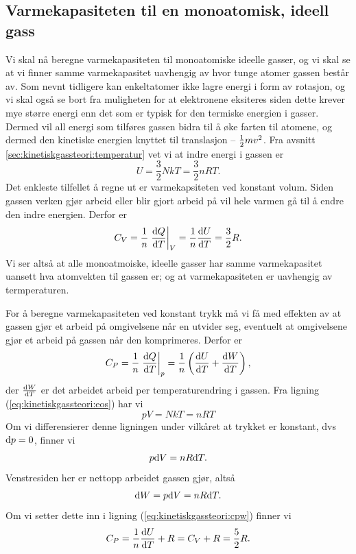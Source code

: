 \subsection{Varmekapasiteten til en monoatomisk, ideell gass}
Vi skal nå beregne varmekapasiteten til monoatomiske ideelle gasser, og vi skal se at vi finner samme varmekapasitet uavhengig av hvor tunge atomer gassen består av. Som nevnt tidligere kan enkeltatomer ikke lagre energi i form av rotasjon, og vi skal også se bort fra muligheten for at elektronene eksiteres siden dette krever mye større energi enn det som er typisk for den termiske energien i gasser. Dermed vil all energi som tilføres gassen bidra til å øke farten til atomene, og dermed den kinetiske energien knyttet til translasjon -- $\frac{1}{2} mv^2$. Fra avsnitt \ref{sec:kinetiskgassteori:temperatur} vet vi at indre energi i gassen er 
\begin{displaymath}
	U = \frac{3}{2}NkT = \frac{3}{2}nRT.
\end{displaymath}
Det enkleste tilfellet å regne ut er varmekapsiteten ved konstant volum. Siden gassen verken gjør arbeid eller blir gjort arbeid på vil hele varmen gå til å endre den indre energien. Derfor er 
\begin{displaymath}
	C_V = \frac{1}{n}\left.\frac{\text{d} Q}{\text{d} T}\right|_V = \frac{1}{n}\frac{\text{d} U}{\text{d} T} = \frac{3}{2}R.
\end{displaymath}
Vi ser altså at alle monoatmoiske, ideelle gasser har samme varmekapasitet uansett hva atomvekten til gassen er; og at varmekapasiteten er uavhengig av termperaturen. 

For å beregne varmekapasiteten ved konstant trykk må vi få med effekten av at gassen gjør et arbeid på omgivelsene når en utvider seg, eventuelt at omgivelsene gjør et arbeid på gassen når den komprimeres. Derfor er 
\begin{equation}
\label{eq:kinetiskgassteori:cpw}
	C_P = \frac{1}{n}\left.\frac{\text{d} Q}{\text{d} T}\right|_p = \frac{1}{n}\left(\frac{\text{d} U}{\text{d} T} + \frac{\text{d} W}{\text{d} T}\right), 
\end{equation}
der $\frac{\text{d} W}{\text{d} T}$ er det arbeidet arbeid per temperaturendring i gassen. Fra ligning (\ref{eq:kinetiskgassteori:eos}) har vi
\begin{displaymath}
	pV = NkT = nRT
\end{displaymath}
Om vi differensierer denne ligningen under vilkåret at trykket er konstant, dvs $\text{d} p = 0$, finner vi
\begin{displaymath}
	p\text{d} V = nR\text{d} T.
\end{displaymath}
Venstresiden her er nettopp arbeidet gassen gjør, altså
\begin{displaymath}
	\text{d} W = p\text{d} V = nR\text{d} T.
\end{displaymath}
Om vi setter dette inn i ligning (\ref{eq:kinetiskgassteori:cpw}) finner vi
\begin{displaymath}
	C_P = \frac{1}{n}\frac{\text{d} U}{\text{d} T} + R = C_V + R = \frac{5}{2}R.
\end{displaymath}

